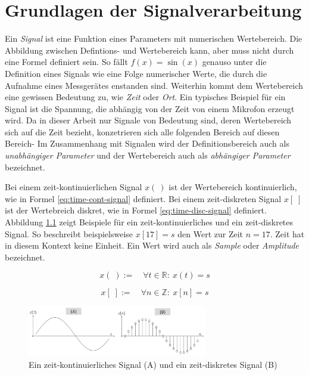 \chapter{Grundlagen der Signalverarbeitung}

Ein \emph{Signal} ist eine Funktion eines Parameters mit numerischen Wertebereich. Die Abbildung zwischen Defintions- und Wertebereich kann, aber muss nicht durch eine Formel definiert sein. So fällt $f(x) = \sin( x )$ genauso unter die Definition eines Signals wie eine Folge numerischer Werte, die durch die Aufnahme eines Messgerätes enstanden sind. Weiterhin kommt dem Wertebereich eine gewissen Bedeutung zu, wie \emph{Zeit} oder \emph{Ort}. Ein typisches Beispiel für ein Signal ist die Spannung, die abhängig von der Zeit von einem Mikrofon erzeugt wird.  Da in dieser Arbeit nur Signale von Bedeutung sind, deren Wertebereich sich auf die Zeit bezieht, konzetrieren sich alle folgenden Bereich auf diesen Bereich- Im Zusammenhang mit Signalen wird der Definitionsbereich auch als \emph{unabhängiger Parameter} und der Wertebereich auch als \emph{abhängiger Parameter} bezeichnet. \cite[S. 11-12]{dspGuide} \cite[S. 22-23]{dspMichigan}

\medskip

 Bei einem zeit-kontinuierlichen Signal $x( \: )$ ist der Wertebereich kontinuierlich, wie in Formel  \ref{eq:time-cont-signal} definiert. Bei einem zeit-diskreten Signal $x[\;]$ ist der Wertebreich diskret, wie in Formel \ref{eq:time-disc-signal} definiert. Abbildung \ref{img:aSignal} zeigt Beispiele für ein zeit-kontinuierliches und ein zeit-diskretes Signal.  So beschreibt beispielsweise $x[17] = s$ den Wert zur Zeit $n = 17$. \glqq Zeit\grqq{} hat in diesem Kontext keine Einheit. Ein Wert wird auch als \emph{Sample} oder \emph{Amplitude} bezeichnet. \cite[S. 22 - 23]{dspMichigan}

 \begin{equation}
x(\;) := \quad \forall t \in \mathbb{R} :\ x(t) = s
\label{eq:time-cont-signal}
\end{equation}


\begin{equation}
x[\;] := \quad  \forall n \in \mathbb{Z} :\ x[n] = s
\label{eq:time-disc-signal}
\end{equation}

\begin{figure}
	\centering
	\includegraphics[width=0.7\textwidth]{bilder/aSignal04.png}
	\caption{Ein zeit-kontinuierliches Signal (A) und ein zeit-diskretes Signal (B)}
	\label{img:aSignal}
\end{figure}

